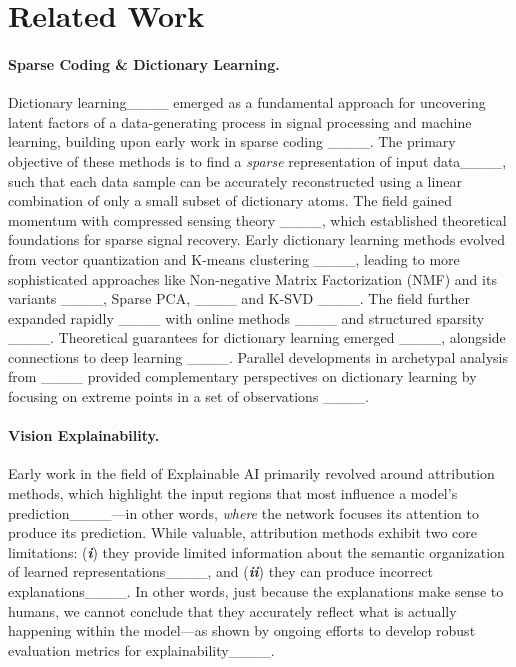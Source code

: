 \section{Related Work}
\label{sec:related_work}
\paragraph{Sparse Coding \& Dictionary Learning.}
Dictionary learning____ emerged as a fundamental approach for uncovering latent factors of a data-generating process in signal processing and machine learning, building upon early work in sparse coding ____.
The primary objective of these methods is to find a \emph{sparse} representation of input data____, such that each data sample can be accurately reconstructed using a linear combination of only a small subset of dictionary atoms.
The field gained momentum with compressed sensing theory ____, which established theoretical foundations for sparse signal recovery. 
Early dictionary learning methods evolved from vector quantization and K-means clustering ____, leading to more sophisticated approaches like Non-negative Matrix Factorization (NMF) and its variants ____, Sparse PCA, ____ and K-SVD ____. 
The field further expanded rapidly ____ with online methods ____ and structured sparsity ____. 
Theoretical guarantees for dictionary learning emerged ____, alongside connections to deep learning ____. 
Parallel developments in archetypal analysis from ____ provided complementary perspectives on dictionary learning by focusing on extreme points in a set of observations ____.\vspace{-5pt}


\vspace{-2mm}
\paragraph{Vision Explainability.} Early work in the field of Explainable AI primarily revolved around attribution methods, which highlight the input regions that most influence a model’s prediction____---in other words, \emph{where} the network focuses its attention to produce its prediction. 
While valuable, attribution methods exhibit two core limitations: (\textit{\textbf{i}}) they provide limited information about the semantic organization of learned representations____, and 
(\textit{\textbf{ii}}) they can produce incorrect explanations____.
In other words, just because the explanations make sense to humans, we cannot conclude that they accurately reflect what is actually happening within the model---as shown by ongoing efforts to develop robust evaluation metrics for explainability____.

